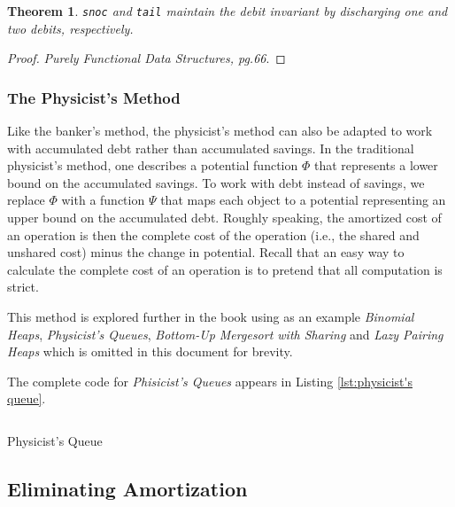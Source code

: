 \documentclass[12pt, a4paper]{article} %
\newtheorem{theorem}{Theorem}[section]     %
\newcommand{\code}[1]{\texttt{#1}} %
\begin{document}
\begin{theorem}
  \code{snoc} and \code{tail} maintain the debit invariant by discharging one and two debits, respectively.
\end{theorem}

\begin{proof}
  \textit{Purely Functional Data Structures, pg.66}.
\end{proof}

\subsubsection{The Physicist's Method}%

Like the banker's method, the physicist's method can also be adapted to work with accumulated debt rather than accumulated savings. In the traditional physicist's method, one describes a potential function $\Phi$ that represents a lower bound on the accumulated savings. To work with debt instead of savings, we replace $\Phi$ with a function $\Psi$ that maps each object to a potential representing an upper bound on the accumulated debt. Roughly speaking, the amortized cost of an operation is then the complete cost of the operation (i.e., the shared and unshared cost) minus the change in potential. Recall that an easy way to calculate the complete cost of an operation is to pretend that all computation is strict.

This method is explored further in the book using as an example \textit{Binomial Heaps}, \textit{Physicist's Queues}, \textit{Bottom-Up Mergesort with Sharing} and \textit{Lazy Pairing Heaps} which is omitted in this document for brevity.

The complete code for \textit{Phisicist's Queues} appears in Listing \ref{lst:physicist's queue}.

\begin{listing}[H]
  \inputminted[breaklines=true]{haskell}{../../Chapter6/PhysicistQueue.hs}
  \caption{Physicist's Queue}
  \label{lst:physicist's queue}
\end{listing}








\subsection{Eliminating Amortization}%
\label{sub:Eliminating Amortization}
\end{document}
